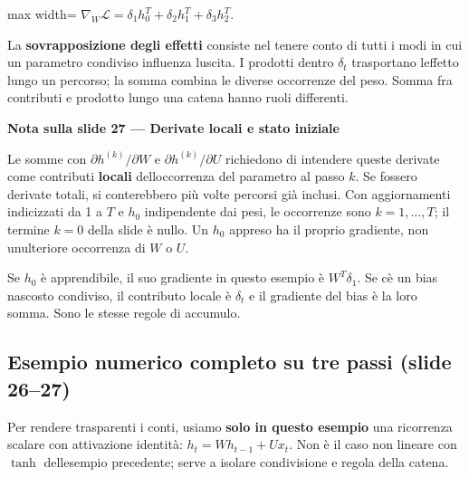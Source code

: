 \documentclass[11pt,a4paper,oneside,openany]{book}
\renewenvironment{quote}{\list{}{\leftmargin=1em\rightmargin=0pt}\item\relax}{\endlist}
\begin{document}
\begin{center}
\begin{adjustbox}{max width=\linewidth}
$\displaystyle \nabla_W\mathcal L=\delta_1h_0^T+\delta_2h_1^T+\delta_3h_2^T.$
\end{adjustbox}
\end{center}

La \textbf{sovrapposizione degli effetti} consiste nel tenere conto di tutti i modi in cui un parametro condiviso influenza l\textquotesingle uscita. I prodotti dentro \(\delta_t\) trasportano l\textquotesingle effetto lungo un percorso; la somma combina le diverse occorrenze del peso. Somma fra contributi e prodotto lungo una catena hanno ruoli differenti.

\begin{quote}
\textbf{Nota sulla slide 27 --- Derivate locali e stato iniziale}
\end{quote}

\begin{quote}
Le somme con \(\partial h^{(k)}/\partial W\) e \(\partial h^{(k)}/\partial U\) richiedono di intendere queste derivate come contributi \textbf{locali} dell\textquotesingle occorrenza del parametro al passo \(k\). Se fossero derivate totali, si conterebbero più volte percorsi già inclusi. Con aggiornamenti indicizzati da 1 a \(T\) e \(h_0\) indipendente dai pesi, le occorrenze sono \(k=1,\ldots,T\); il termine \(k=0\) della slide è nullo. Un \(h_0\) appreso ha il proprio gradiente, non un\textquotesingle ulteriore occorrenza di \(W\) o \(U\).
\end{quote}

Se \(h_0\) è apprendibile, il suo gradiente in questo esempio è \(W^T\delta_1\). Se c\textquotesingle è un bias nascosto condiviso, il contributo locale è \(\delta_t\) e il gradiente del bias è la loro somma. Sono le stesse regole di accumulo.

\subsection{Esempio numerico completo su tre passi (slide 26--27)}\label{f03-r502}

Per rendere trasparenti i conti, usiamo \textbf{solo in questo esempio} una ricorrenza scalare con attivazione identità: \(h_t=Wh_{t-1}+Ux_t\). Non è il caso non lineare con \(\tanh\) dell\textquotesingle esempio precedente; serve a isolare condivisione e regola della catena.
\end{document}
